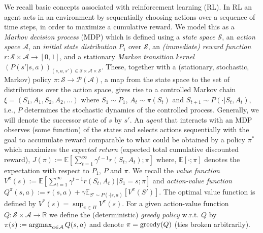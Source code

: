 \documentclass[letterpaper]{article}
\newcommand{\cA}{{\mathcal A}}
\newcommand{\cS}{{\mathcal S}}
\newcommand{\cP}{{\mathcal P}}
\newcommand{\E}{{\mathbb E}}
\newcommand{\R}{{\mathbb R}}
\newcommand{\argmax}{\operatornamewithlimits{argmax}}
\newcommand{\greedy}{\operatornamewithlimits{greedy}}
\begin{document}
We recall basic concepts associated with reinforcement learning (RL). In RL an agent acts in an environment by sequentially choosing actions over a sequence of time steps, in order to maximize a cumulative reward. We model this as a \emph{Markov decision process} (MDP) which is defined using 
a \emph{state space} $\cS$, 
an \emph{action space} $\cA$, 
an \emph{initial state distribution} $P_1$ over $\cS$, 
an \emph{(immediate) reward function} $r: \cS \times \cA \to [0,1]$,
and a stationary \emph{Markov transition kernel} $(P(s' |s,a))_{(s,a,s')\in \cS \times \cA \times \cS}$. 
These, together with a (stationary, stochastic, Markov) policy $\pi: \cS \to \cP(\cA)$, a map from the state space to the set of distributions over the action space, gives rise to a controlled Markov chain $\xi=(S_1,A_1,S_2,A_2,\dots)$ where $S_1 \sim P_1$, $A_t \sim \pi(S_t)$ and $S_{t+1} \sim P(\cdot|S_t,A_t)$, i.e., $P$ determines the stochastic dynamics of the controlled process.
Generally, we will denote the successor state of $s$ by $s'$. %
An \emph{agent} that interacts with an MDP observes (some function) of the states and selects actions sequentially with the goal 
to accumulate reward comparable to what could be obtained by a policy $\pi^*$ which maximizes the \emph{expected return} (expected total cumulative discounted reward), $J(\pi):= \E [\sum_{t=1}^\infty \gamma^{t-1} r(S_t,A_t) ; \pi]$ where,  $\E [ \cdot ; \pi]$ denotes the expectation with respect to $P_1$, $P$ and $\pi$. We recall the \emph{value function} $V^\pi(s) :=  \E [\sum_{t=1}^\infty \gamma^{t-1} r(S_t,A_t) | S_1 =s ; \pi]$ and \emph{action-value function} $Q^\pi(s,a) := r(s,a) + \gamma \E_{S'\sim P(\cdot|s,a)} [V^\pi(S')]$. The optimal value function is defined by $V^*(s) = \sup_{\pi\in\Pi} V^\pi(s)$.
For a given action-value function $Q:\cS\times\cA\to\R$ we define the (deterministic) \emph{greedy policy} w.r.t. $Q$ by $\pi(s) := \argmax_{a\in\cA} Q(s,a)$ and denote $\pi = {\greedy}(Q)$ (ties broken arbitrarily). 
\end{document}
